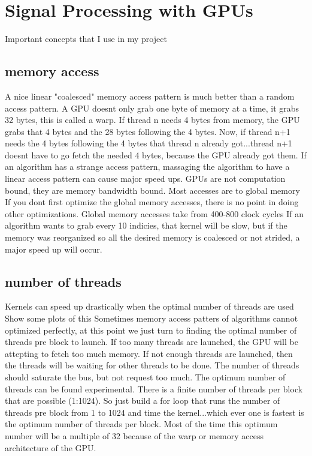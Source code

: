 

\chapter{Signal Processing with GPUs}
\label{sec:gpu}

Important concepts that I use in my project



\section{memory access}
	A nice linear "coalesced" memory access pattern is much better than a random access pattern. A GPU doesnt only grab one byte of memory at a time, it grabs 32 bytes, this is called a warp.
	If thread n needs 4 bytes from memory, the GPU grabs that 4 bytes and the 28 bytes following the 4 bytes. Now, if thread n+1 needs the 4 bytes following the 4 bytes that thread n already got...thread n+1 doesnt have to go fetch the needed 4 bytes, because the GPU already got them.
	If an algorithm has a strange access pattern, massaging the algorithm to have a linear access pattern can cause major speed ups.
	GPUs are not computation bound, they are memory bandwidth bound.
	Most accesses are to global memory
	If you dont first optimize the global memory accesses, there is no point in doing other optimizations.
	Global memory accesses take from 400-800 clock cycles 
	If an algorithm wants to grab every 10 indicies, that kernel will be slow, but if the memory was reorganized so all the desired memory is coalesced or not strided, a major speed up will occur.	
	
\section{number of threads}
	Kernels can speed up drastically when the optimal number of threads are used 
	Show some plots of this
	Sometimes memory access patters of algorithms cannot optimized perfectly, at this point we just turn to finding the optimal number of threads pre block to launch.
	If too many threads are launched, the GPU will be attepting to fetch too much memory. If not enough threads are launched, then the threads will be waiting for other threads to be done.
	The number of threads should saturate the bus, but not request too much.
	The optimum number of threads can be found experimental. There is a finite number of threads per block that are possible (1:1024). So just build a for loop that runs the number of threads pre block from 1 to 1024 and time the kernel...which ever one is fastest is the optimum number of threads per block.
	Most of the time this optimum number will be a multiple of 32 because of the warp or memory access architecture of the GPU.

